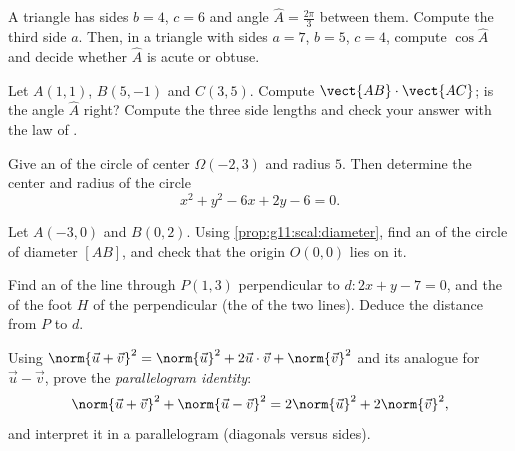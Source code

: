 \begin{exercise}[$\star\star$]\label{exo:g11:scal:5}
A triangle has sides $b = 4$, $c = 6$ and angle
$\widehat A = \frac{2\pi}{3}$ between them. Compute the third side $a$.
Then, in a triangle with sides $a = 7$, $b = 5$, $c = 4$, compute
$\cos\widehat A$ and decide whether $\widehat A$ is acute or obtuse.
\end{exercise}

\begin{exercise}[$\star\star$]\label{exo:g11:scal:6}
Let $A(1, 1)$, $B(5, -1)$ and $C(3, 5)$. Compute
$\vect{AB} \cdot \vect{AC}$; is the angle $\widehat A$ right? Compute the
three side lengths and check your answer with the law of .
\end{exercise}

\begin{exercise}[$\star\star$]\label{exo:g11:scal:7}
Give an  of the circle of center $\Omega(-2, 3)$ and radius $5$.
Then determine the center and radius of the circle
\[
x^2 + y^2 - 6x + 2y - 6 = 0 .
\]
\end{exercise}

\begin{exercise}[$\star\star$]\label{exo:g11:scal:8}
Let $A(-3, 0)$ and $B(0, 2)$. Using \cref{prop:g11:scal:diameter}, find
an  of the circle of diameter $[AB]$, and check that the origin
$O(0,0)$ lies on it.
\end{exercise}

\begin{exercise}[$\star\star$]\label{exo:g11:scal:9}
Find an  of the line through $P(1, 3)$ perpendicular to
$d : 2x + y - 7 = 0$, and the  of the foot $H$ of the
perpendicular (the  of the two lines). Deduce the distance
from $P$ to $d$.
\end{exercise}

\begin{exercise}[$\star\star$]\label{exo:g11:scal:10}
Using $\norm{\vec u + \vec v}^2 = \norm{\vec u}^2 + 2\vec u\cdot\vec v +
\norm{\vec v}^2$ and its analogue for $\vec u - \vec v$, prove the
\emph{parallelogram identity}:
\[
\norm{\vec u + \vec v}^2 + \norm{\vec u - \vec v}^2
= 2\norm{\vec u}^2 + 2\norm{\vec v}^2 ,
\]
and interpret it in a parallelogram (diagonals versus sides).
\end{exercise}

